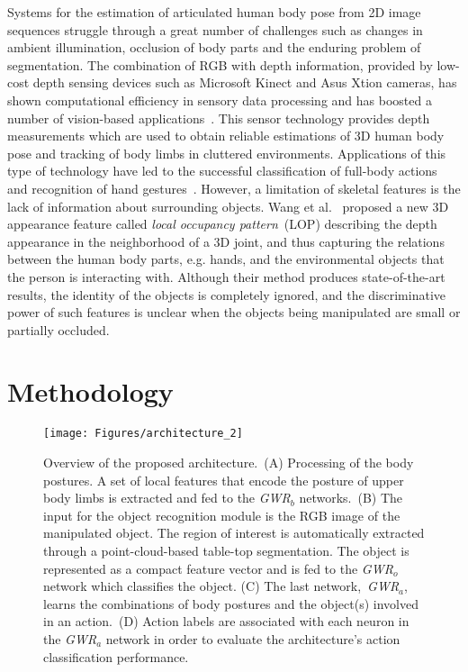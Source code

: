 \documentclass[5p,times]{elsarticle}
\begin{document}
Systems for the estimation of articulated human body pose from 2D image sequences struggle through a great number of challenges such as changes in ambient illumination, occlusion of body parts and the enduring problem of segmentation.
The combination of RGB with depth information, provided by low-cost depth sensing devices such as Microsoft Kinect and Asus Xtion cameras, has shown computational efficiency in sensory data processing and has boosted a number of vision-based applications~\citep{HanMicrosoft}.
This sensor technology provides depth measurements which are used to obtain reliable estimations of 3D human body pose and tracking of body limbs in cluttered environments.
Applications of this type of technology have led to the successful classification of full-body actions and recognition of hand gestures~\citep{aggarwal2014human}.
However, a limitation of skeletal features is the lack of information about surrounding objects.
Wang et al.~\cite{Wang2014} proposed a new 3D appearance feature called \textit{local occupancy pattern}~(LOP) describing the depth appearance in the neighborhood of a 3D joint, and thus capturing the relations between the human body parts, e.g. hands, and the environmental objects that the person is interacting with.
Although their method produces state-of-the-art results, the identity of the objects is completely ignored, and the discriminative power of such features is unclear when the objects being manipulated are small or partially occluded.

\section{Methodology}\label{sec:arch}

\begin{figure*}
\begin{center}
\texttt{[image: Figures/architecture\_2]}
\end{center}
\caption{Overview of the proposed architecture.~(A) Processing of the body postures. A set of local features that encode the posture of upper body limbs is extracted and fed to the \textit{GWR}$_b$ networks.~(B) The input for the
object recognition module is the RGB image of the manipulated object. The region of interest is automatically extracted through a point-cloud-based table-top segmentation. The object is represented as a compact feature vector and is fed to the \textit{GWR}$_o$ network which classifies the object. (C) The last network,~\textit{GWR}$_a$, learns the combinations of body postures and the object(s) involved in an action.~(D) Action labels are associated with each neuron in the \textit{GWR}$_a$ network in order to evaluate the architecture's action classification performance.}\label{fig:arch}
\end{figure*}
\end{document}
